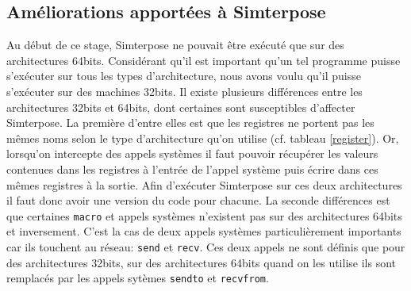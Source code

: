\subsection{Améliorations apportées à Simterpose}

Au début de ce stage, Simterpose ne pouvait être exécuté que sur des architectures 64bits. Considérant qu'il est important qu'un tel programme puisse s'exécuter sur tous les types d'architecture, nous avons voulu qu'il puisse s'exécuter sur des machines 32bits. Il existe plusieurs différences entre les architectures 32bits et 64bits, dont certaines sont susceptibles d'affecter Simterpose. La première d'entre elles est que les registres ne portent pas les mêmes noms selon le type d'architecture qu'on utilise (cf. tableau \ref{register}). Or, lorsqu'on intercepte des appels systèmes il faut pouvoir récupérer les valeurs contenues dans les registres à l'entrée de l'appel système puis écrire dans ces mêmes registres à la sortie. Afin d'exécuter Simterpose sur ces deux architectures il faut donc avoir une version du code pour chacune. La seconde différences est que certaines \texttt{macro} et appels systèmes n'existent pas sur des architectures 64bits et inversement. C'est la cas de deux appels systèmes particulièrement importants car ils touchent au réseau: \texttt{send} et \texttt{recv}. Ces deux appels ne sont définis que pour des architectures 32bits, sur des architectures 64bits quand on les utilise ils sont remplacés par les appels sytèmes \texttt{sendto} et \texttt{recvfrom}.

